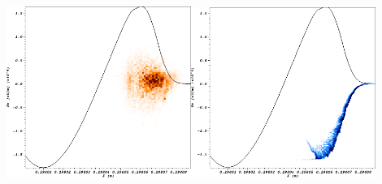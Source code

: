 \documentclass[8pt]{beamer}
\begin{document}
\begin{frame}
\begin{center}
\includegraphics[width=0.45\textwidth]{visit0058}\hspace{15pt}\includegraphics[width=0.45\textwidth]{visit0063}
\end{center}


\end{frame}
\end{document}
